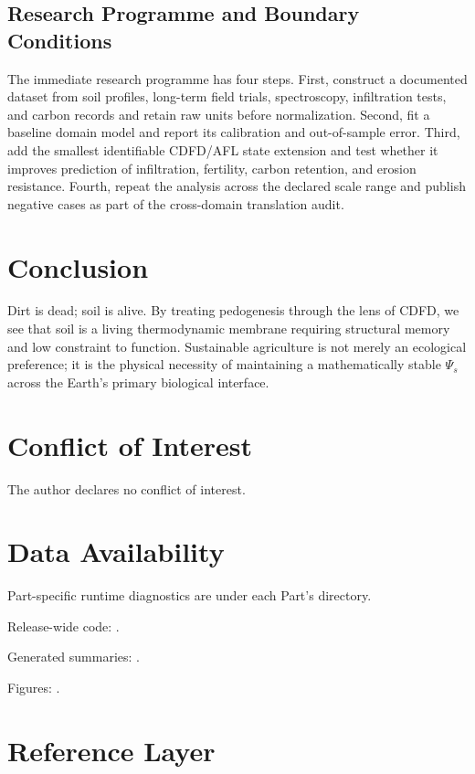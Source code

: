 \documentclass[11pt,a4paper]{article}
\begin{document}
\subsection{Research Programme and Boundary Conditions}

The immediate research programme has four steps. First, construct a documented
dataset from soil profiles, long-term field trials, spectroscopy, infiltration tests, and carbon records and retain raw units before normalization.
Second, fit a baseline domain model and report its calibration and out-of-sample
error. Third, add the smallest identifiable CDFD/AFL state extension and test
whether it improves prediction of infiltration, fertility, carbon retention, and erosion resistance. Fourth, repeat the
analysis across the declared scale range and publish negative cases as part of
the cross-domain translation audit.


\section{Conclusion}
Dirt is dead; soil is alive. By treating pedogenesis through the lens of CDFD, we see that soil is a living thermodynamic membrane requiring structural memory and low constraint to function. Sustainable agriculture is not merely an ecological preference; it is the physical necessity of maintaining a mathematically stable $\Psi_s$ across the Earth's primary biological interface.
\section*{Conflict of Interest} The author declares no conflict of interest.
\section*{Data Availability}
Part-specific runtime diagnostics are under each Part's  directory.

Release-wide code: .

Generated summaries: .

Figures: .


\section{Reference Layer}


\end{document}

